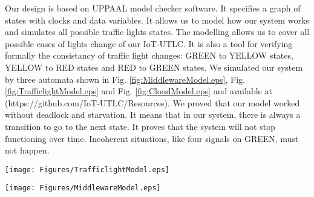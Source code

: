 Our design is based on UPPAAL model checker software.
It specifies a graph of states with clocks and data variables.
It allows us to model how our system works and simulates all possible traffic lights states.
The modelling allows us to cover all possible cases of lights change of our IoT-UTLC.
It is also a tool for verifying formally the consistancy of traffic light changes:
	GREEN to YELLOW states,
	YELLOW to RED states and RED to GREEN states.
We simulated our system by three automata shown in Fig.
\ref{fig:MiddlewareModel.eps},
	Fig.
\ref{fig:TrafficlightModel.eps} and Fig.
\ref{fig:CloudModel.eps} and available at (https://github.com/IoT-UTLC/Resources).
We proved that our model worked without deadlock and starvation.
It means that in our system,
	there is always a transition to go to the next state.
It proves that the system will not stop functioning over time.
Incoherent situations,
	like four signals on GREEN,
	must not happen.




\begin{figure*}[!htb]
\centerline{\texttt{[image: Figures/TrafficlightModel.eps]}}
\caption{Model of our Traffic Lights in UPPAAL}
\label{fig:TrafficlightModel.eps}
\end{figure*}

\begin{figure*}[htbp]
\centering
\centerline{\texttt{[image: Figures/MiddlewareModel.eps]}}
\caption{Model of our Middleware in UPPAAL}
\label{fig:MiddlewareModel.eps}
\end{figure*}

